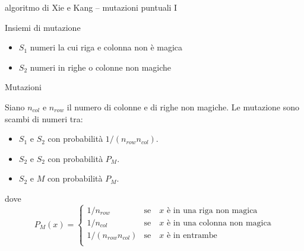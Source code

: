 \documentclass[10pt]{beamer}
\begin{document}
\begin{frame}{algoritmo di Xie e Kang -- mutazioni puntuali I}
	
		
		
    \begin{block}{Insiemi di mutazione}
    	\parbox{0.98\columnwidth}{
    		\begin{itemize}
    			\item $ S_1 $ numeri la cui riga e colonna non è magica
    			\item $ S_2 $ numeri in righe o colonne non magiche
    		\end{itemize}
    	}
    \end{block} 
    
        
    \begin{block}{Mutazioni}
    	\parbox{0.98\columnwidth}{
    		Siano $ n_{col} $ e $ n_{row} $ il numero di colonne e di righe non magiche. Le mutazione sono scambi di numeri tra:
    		\begin{itemize}
    			\item $ S_1 $ e $ S_2 $ con probabilità $ 1/(n_{row}n_{col}) $.
    			\item $ S_2 $ e $ S_2 $ con probabilità $ P_M $.
    			\item $ S_2 $ e $ M $ con probabilità $ P_M $.
    		\end{itemize}
    		dove 
    		\vspace*{-15pt}
    		\[ 
    		P_M(x) = 
    		\begin{cases}
    		1\slash n_{row} & \text{se} \quad x \text{ è in una riga non magica} \\
    		1\slash n_{col} & \text{se} \quad x \text{ è in una colonna non magica} \\
    		1\slash \left(n_{row} n_{col} \right) & \text{se} \quad x \text{ è in entrambe} \\
    		\end{cases}
    		\]
    	}
    \end{block} 
    

\end{frame}
\end{document}
